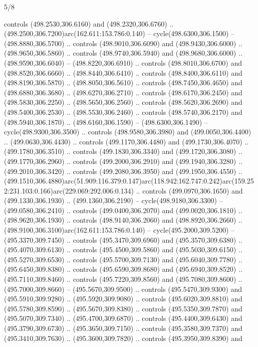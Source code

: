 \begin{flagdescription}{5/8}
\begin{scope}[xshift=0.5\flaglength,yshift=0.5\flagwidth,scale=\flagwidth/475.63]
\begin{scope}[y=0.8pt, x=0.8pt, yscale=-1, xscale=1,shift={(-450,-300)}]
\begin{scope}[cm={{1.0,0.0,0.0,1.0,(-0.0002,0.12556)}},cm={{1.0,0.0,0.0,1.0,(0.00179,0.0)}}]
\begin{scope}[cm={{1.11592,0.0,0.0,1.11592,(-106.89933,-41.77764)}}]
\begin{scope}[draw=black,fill=cfff]
\begin{scope}[fill=black]
  controls (498.2530,306.6160) and (498.2320,306.6760) ..
  (498.2500,306.7200)arc(162.611:153.786:0.140) -- cycle(498.6300,306.1500) --
  (498.8880,306.5700) .. controls (498.9010,306.6090) and (498.9430,306.6000) ..
  (498.9650,306.5860) .. controls (498.9740,306.5940) and (498.9680,306.6000) ..
  (498.9590,306.6040) -- (498.8220,306.6910) .. controls (498.8010,306.6700) and
  (498.8520,306.6660) .. (498.8440,306.6410) .. controls (498.8400,306.6110) and
  (498.8190,306.5870) .. (498.8050,306.5610) .. controls (498.7450,306.4650) and
  (498.6880,306.3680) .. (498.6270,306.2710) .. controls (498.6170,306.2450) and
  (498.5830,306.2250) .. (498.5650,306.2560) .. controls (498.5620,306.2690) and
  (498.5400,306.2530) .. (498.5530,306.2460) .. controls (498.5740,306.2170) and
  (498.5940,306.1870) .. (498.6160,306.1590) -- (498.6300,306.1490) --
  cycle(498.9300,306.3500) .. controls (498.9580,306.3980) and
  (499.0050,306.4400) .. (499.0630,306.4430) .. controls (499.1170,306.4480) and
  (499.1730,306.4070) .. (499.1780,306.3510) .. controls (499.1830,306.3340) and
  (499.1720,306.3080) .. (499.1770,306.2960) .. controls (499.2000,306.2910) and
  (499.1940,306.3280) .. (499.2010,306.3420) .. controls (499.2080,306.3950) and
  (499.1950,306.4550) ..
  (499.1510,306.4880)arc(51.909:116.379:0.147)arc(118.942:162.747:0.242)arc(159.252:231.103:0.166)arc(229.069:292.006:0.134)
  .. controls (499.0970,306.1650) and (499.1330,306.1930) .. (499.1360,306.2190)
  -- cycle(498.9180,306.3300) -- (499.0580,306.2410) .. controls
  (499.0400,306.2070) and (499.0020,306.1810) .. (498.9620,306.1930) .. controls
  (498.9140,306.2060) and (498.8920,306.2660) ..
  (498.9100,306.3100)arc(162.611:153.786:0.140) -- cycle(495.2000,309.5200) --
  (495.3370,309.7450) .. controls (495.3470,309.6960) and (495.3570,309.6380) ..
  (495.4070,309.6130) .. controls (495.4500,309.5860) and (495.5030,309.6150) ..
  (495.5270,309.6530) .. controls (495.5700,309.7130) and (495.6040,309.7780) ..
  (495.6450,309.8380) .. controls (495.6590,309.8680) and (495.6940,309.8520) ..
  (495.7110,309.8460) .. controls (495.7220,309.8560) and (495.7080,309.8600) ..
  (495.7000,309.8660) -- (495.5670,309.9500) .. controls (495.5470,309.9300) and
  (495.5910,309.9280) .. (495.5920,309.9080) .. controls (495.6020,309.8810) and
  (495.5780,309.8590) .. (495.5670,309.8380) .. controls (495.5350,309.7870) and
  (495.5070,309.7340) .. (495.4700,309.6870) .. controls (495.4400,309.6430) and
  (495.3790,309.6730) .. (495.3650,309.7150) .. controls (495.3580,309.7370) and
  (495.3410,309.7630) .. (495.3600,309.7820) .. controls (495.3950,309.8390) and

\end{scope}
\end{scope}
\end{scope}
\end{scope}
\end{scope}
\end{scope}
\end{flagdescription}
